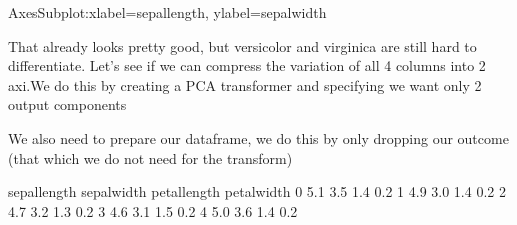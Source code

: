 \documentclass[letterpaper,10pt,english]{jupyterBook}
\begin{document}
\begin{sphinxVerbatim}[commandchars=\\\{\}]
\PYG{p}{[}\PYG{p}{]} \PYG{p}{[}\PYG{p}{]} \PYG{p}{[}\PYG{p}{]}
\end{sphinxVerbatim}

\begin{sphinxVerbatim}[commandchars=\\\{\}]
\PYGZlt{}AxesSubplot:xlabel=\PYGZsq{}sepal\PYGZus{}length\PYGZsq{}, ylabel=\PYGZsq{}sepal\PYGZus{}width\PYGZsq{}\PYGZgt{}
\end{sphinxVerbatim}

\noindent{}

\sphinxAtStartPar
That already looks pretty good, but versicolor and virginica are still hard to differentiate. Let’s see if we can compress the variation of all 4 columns into 2 axi.We do this by creating a PCA transformer and specifying we want only 2 output components

\begin{sphinxVerbatim}[commandchars=\\\{\}]
  
\end{sphinxVerbatim}

\sphinxAtStartPar
We also need to prepare our dataframe, we do this by only dropping our outcome (that which we do not need for the transform)

\begin{sphinxVerbatim}[commandchars=\\\{\}]
  
\end{sphinxVerbatim}

\begin{sphinxVerbatim}[commandchars=\\\{\}]
   sepal\PYGZus{}length  sepal\PYGZus{}width  petal\PYGZus{}length  petal\PYGZus{}width
0           5.1          3.5           1.4          0.2
1           4.9          3.0           1.4          0.2
2           4.7          3.2           1.3          0.2
3           4.6          3.1           1.5          0.2
4           5.0          3.6           1.4          0.2
\end{sphinxVerbatim}
\end{document}
